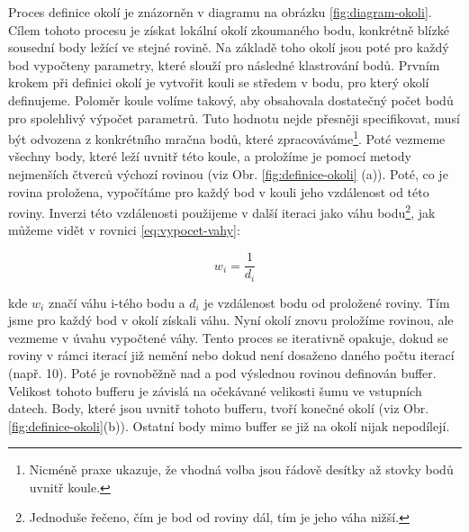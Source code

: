 \documentclass[11pt,twoside,a4paper]{book}
\begin{document}
Proces definice okolí je znázorněn v diagramu na obrázku \ref{fig:diagram-okoli}. Cílem tohoto procesu je získat lokální okolí zkoumaného bodu, konkrétně blízké sousední body ležící ve stejné rovině. Na základě toho okolí jsou poté pro každý bod vypočteny parametry, které slouží pro následné klastrování bodů. Prvním krokem při definici okolí je vytvořit kouli se středem v bodu, pro který okolí definujeme. Poloměr koule volíme takový, aby obsahovala dostatečný počet bodů pro spolehlivý výpočet parametrů. Tuto hodnotu nejde přesněji specifikovat, musí být odvozena z konkrétního mračna bodů, které zpracováváme\footnote{Nicméně praxe ukazuje, že vhodná volba jsou řádově desítky až stovky bodů uvnitř koule.}. Poté vezmeme všechny body, které leží uvnitř této koule, a proložíme je pomocí metody nejmenších čtverců výchozí rovinou (viz Obr. \ref{fig:definice-okoli} (a)). Poté, co je rovina proložena, vypočítáme pro každý bod v kouli jeho vzdálenost od této roviny. Inverzi této vzdálenosti použijeme v další iteraci jako váhu bodu\footnote{Jednoduše řečeno, čím je bod od roviny dál, tím je jeho váha nižší.}, jak můžeme vidět v rovnici \ref{eq:vypocet-vahy}:

\begin{equation}
w_i = \frac{1}{d_i}
\label{eq:vypocet-vahy}
\end{equation}

\noindent
kde $w_i$ značí váhu i-tého bodu a  $d_i$ je vzdálenost bodu od proložené roviny. Tím jsme pro každý bod v okolí získali váhu. Nyní okolí znovu proložíme rovinou, ale vezmeme v úvahu vypočtené váhy. Tento proces  se iterativně opakuje, dokud se roviny v rámci iterací již nemění nebo dokud není dosaženo daného počtu iterací (např. 10). Poté je rovnoběžně nad a pod výslednou rovinou definován buffer. Velikost tohoto bufferu je závislá na očekávané velikosti šumu ve vstupních datech. Body, které jsou uvnitř tohoto bufferu, tvoří konečné okolí (viz Obr. \ref{fig:definice-okoli}(b)). Ostatní body mimo buffer se již na okolí nijak nepodílejí.
\end{document}
